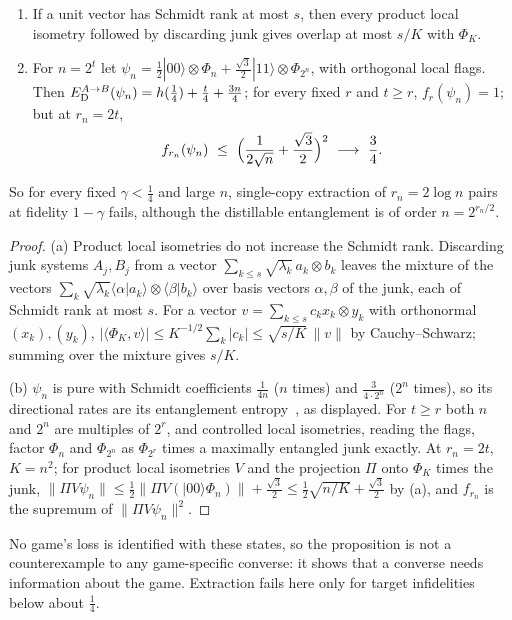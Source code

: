 \begin{proposition}[A separation]\label{prop:separation}
\begin{enumerate}[label=(\alph*),itemsep=1pt]
\item If a unit vector has Schmidt rank at most $s$, then every product local isometry followed by discarding junk gives overlap
at most $s/K$ with $\Phi_K$.
\item For $n=2^t$ let $\psi_n=\frac12|00\rangle\otimes\Phi_n+\frac{\sqrt3}2|11\rangle\otimes\Phi_{2^n}$, with orthogonal local flags. Then
$E_{\mathrm D}^{A\to B}(\psi_n)=h(\frac14)+\frac t4+\frac{3n}4$; for every fixed $r$ and $t\ge r$, $f_r(\psi_n)=1$; but at $r_n=2t$,
\[
f_{r_n}(\psi_n)\ \le\ \Bigl(\frac1{2\sqrt n}+\frac{\sqrt3}2\Bigr)^2\ \longrightarrow\ \frac34 .
\]
\end{enumerate}
So for every fixed $\gamma<\frac14$ and large $n$, single-copy extraction of $r_n=2\log n$ pairs at fidelity $1-\gamma$ fails, although
the distillable entanglement is of order $n=2^{r_n/2}$.
\end{proposition}

\begin{proof}
(a) Product local isometries do not increase the Schmidt rank. Discarding junk systems $A_j,B_j$ from a vector
$\sum_{k\le s}\sqrt{\lambda_k}\,a_k\otimes b_k$ leaves the mixture of the vectors $\sum_k\sqrt{\lambda_k}\langle\alpha|a_k\rangle\otimes\langle\beta|b_k\rangle$ over
basis vectors $\alpha,\beta$ of the junk, each of Schmidt rank at most $s$. For a vector $v=\sum_{k\le s}c_kx_k\otimes y_k$ with orthonormal
$(x_k),(y_k)$, $|\langle\Phi_K,v\rangle|\le K^{-1/2}\sum_k|c_k|\le\sqrt{s/K}\,\|v\|$ by Cauchy--Schwarz; summing over the mixture gives $s/K$.

(b) $\psi_n$ is pure with Schmidt coefficients $\frac1{4n}$ ($n$ times) and $\frac3{4\cdot2^n}$ ($2^n$ times), so its directional rates are its
entanglement entropy~\cite{BBPS96}, as displayed. For $t\ge r$ both $n$ and $2^n$ are multiples of $2^r$, and controlled local isometries,
reading the flags, factor $\Phi_n$ and $\Phi_{2^n}$ as $\Phi_{2^r}$ times a maximally entangled junk exactly. At $r_n=2t$, $K=n^2$; for product
local isometries $V$ and the projection $\Pi$ onto $\Phi_K$ times the junk, $\|\Pi V\psi_n\|\le\frac12\|\Pi V(|00\rangle\Phi_n)\|+\frac{\sqrt3}2\le
\frac12\sqrt{n/K}+\frac{\sqrt3}2$ by (a), and $f_{r_n}$ is the supremum of $\|\Pi V\psi_n\|^2$.
\end{proof}

No game's loss is identified with these states, so the proposition is not a counterexample to any game-specific converse: it shows
that a converse needs information about the game. Extraction fails here only for target infidelities below about $\frac14$.


